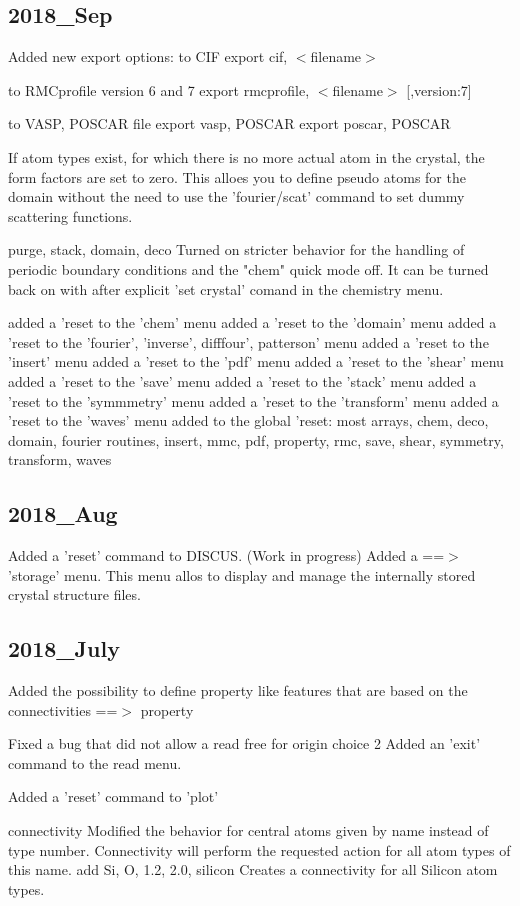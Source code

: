 \subsection*{2018\_Sep}
\par
Added new export options: 
to CIF 
export cif, $ <$filename$> $ 
\par
to RMCprofile version 6 and 7 
export rmcprofile, $ <$filename$> $ [,version:7] 
\par
to VASP, POSCAR file 
export vasp, POSCAR 
export poscar, POSCAR 
\par
If atom types exist, for which there is no more actual atom in 
the crystal, the form factors are set to zero. This alloes you 
to define pseudo atoms for the domain without the need to 
use the 'fourier/scat' command to set dummy scattering 
functions. 
\par
purge, stack, domain, deco 
   Turned on stricter behavior for the handling of 
   periodic boundary conditions and the "chem" quick mode 
   off. It can be turned back on with after explicit 
   'set crystal' comand in the chemistry menu. 
\par
added a 'reset to the 'chem' menu 
added a 'reset to the 'domain' menu 
added a 'reset to the 'fourier', 'inverse', difffour', patterson' menu 
added a 'reset to the 'insert' menu 
added a 'reset to the 'pdf' menu 
added a 'reset to the 'shear' menu 
added a 'reset to the 'save' menu 
added a 'reset to the 'stack' menu 
added a 'reset to the 'symmmetry' menu 
added a 'reset to the 'transform' menu 
added a 'reset to the 'waves' menu 
added to the global 'reset: 
    most arrays, chem, deco, domain, fourier routines, insert, mmc, 
    pdf, property, rmc, save, shear, symmetry, transform, waves 
\par
\subsection*{2018\_Aug}
\par
Added a 'reset' command to DISCUS. (Work in progress) 
Added a ==$> $ 'storage' menu. 
   This menu allos to display and manage the internally stored 
   crystal structure files. 
\subsection*{2018\_July}
\par
Added the possibility to define property like features 
that are based on the connectivities ==$> $ property 
\par
Fixed a bug that did not allow a read free for origin choice 2 
Added an 'exit' command to the read menu. 
\par
Added a 'reset' command to 'plot' 
\par
connectivity 
   Modified the behavior for central atoms given by name 
   instead of type number. Connectivity will perform the 
   requested action for all atom types of this name. 
   add Si, O, 1.2, 2.0, silicon 
   Creates a connectivity for all Silicon atom types. 
\par
